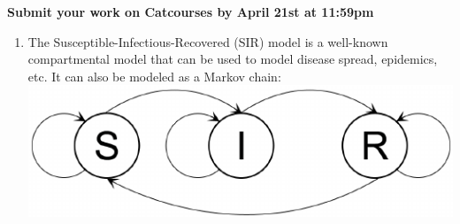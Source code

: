 \documentclass[11pt]{article}
\begin{document}
{\bf Submit your work on Catcourses by April 21st at 11:59pm}

\begin{enumerate}
\item The Susceptible-Infectious-Recovered (SIR) model is a well-known compartmental model that can be used to model disease spread, epidemics, etc. It can also be modeled as a Markov chain:
\includegraphics[width=0.5\linewidth]{SIR.png}

\end{enumerate}
\end{document}
